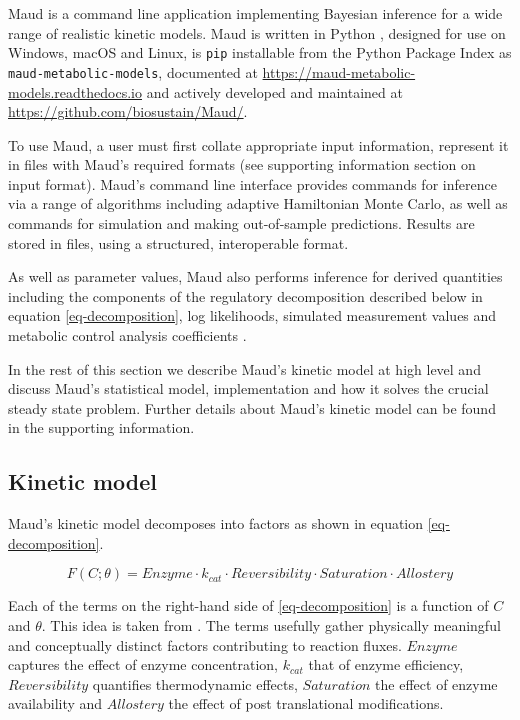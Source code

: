 \documentclass[journal=asbcd6,manuscript=article,layout=traditional]{achemso}
\begin{document}
Maud is a command line application implementing Bayesian inference for a
wide range of realistic kinetic models. Maud is written in Python
\citep{vanrossumPythonReferenceManual2009}, designed for use on Windows,
macOS and Linux, is \texttt{pip} installable from the Python Package
Index as \texttt{maud-metabolic-models}, documented at
\url{https://maud-metabolic-models.readthedocs.io} and actively
developed and maintained at \url{https://github.com/biosustain/Maud/}.

To use Maud, a user must first collate appropriate input information,
represent it in files with Maud's required formats (see supporting
information section on input format). Maud's command line interface
provides commands for inference via a range of algorithms including
adaptive Hamiltonian Monte Carlo, as well as commands for simulation and
making out-of-sample predictions. Results are stored in files, using a
structured, interoperable format.

As well as parameter values, Maud also performs inference for derived
quantities including the components of the regulatory decomposition
described below in equation \eqref{eq-decomposition}, log likelihoods,
simulated measurement values and metabolic control analysis coefficients
\citep{kacser_control_1973}.

In the rest of this section we describe Maud's kinetic model at high
level and discuss Maud's statistical model, implementation and how it
solves the crucial steady state problem. Further details about Maud's
kinetic model can be found in the supporting information.

\hypertarget{kinetic-model}{%
\subsection{Kinetic model}\label{kinetic-model}}

Maud's kinetic model decomposes into factors as shown in equation
\eqref{eq-decomposition}.

\begin{equation}
F(C;\theta) = Enzyme\cdot k_{cat}\cdot Reversibility \cdot Saturation \cdot Allostery \label{eq-decomposition}
\end{equation}

Each of the terms on the right-hand side of \eqref{eq-decomposition} is
a function of \(C\) and \(\theta\). This idea is taken from
\citet{noor_note_2013}. The terms usefully gather physically meaningful
and conceptually distinct factors contributing to reaction fluxes.
\(Enzyme\) captures the effect of enzyme concentration, \(k_{cat}\) that
of enzyme efficiency, \(Reversibility\) quantifies thermodynamic
effects, \(Saturation\) the effect of enzyme availability and
\(Allostery\) the effect of post translational modifications.
\end{document}
